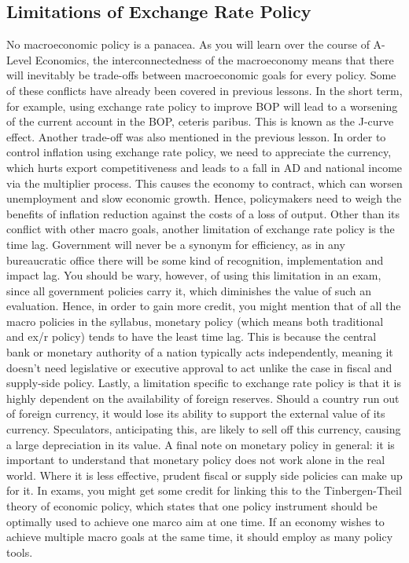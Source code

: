 \documentclass[DIV=classic,11pt,numbers=noenddot,listof=totoc,bibliography=totoc,parskip]{scrartcl}
\begin{document}
\subsection{Limitations of Exchange Rate Policy}
No macroeconomic policy is a panacea. As you will learn over the course of A-Level Economics, the interconnectedness of the macroeconomy means that there will inevitably be trade-offs between macroeconomic goals for every policy. Some of these conflicts have already been covered in previous lessons. In the short term, for example, using exchange rate policy to improve BOP will lead to a worsening of the current account in the BOP, ceteris paribus. This is known as the J-curve effect. Another trade-off was also mentioned in the previous lesson. In order to control inflation using exchange rate policy, we need to appreciate the currency, which hurts export competitiveness and leads to a fall in AD and national income via the multiplier process. This causes the economy to contract, which can worsen unemployment and slow economic growth. Hence, policymakers need to weigh the benefits of inflation reduction against the costs of a loss of output. Other than its conflict with other macro goals, another limitation of exchange rate policy is the time lag. Government will never be a synonym for efficiency, as in any bureaucratic office there will be some kind of recognition, implementation and impact lag. You should be wary, however, of using this limitation in an exam, since all government policies carry it, which diminishes the value of such an evaluation. Hence, in order to gain more credit, you might mention that of all the macro policies in the syllabus, monetary policy (which means both traditional and ex/r policy) tends to have the least time lag. This is because the central bank or monetary authority of a nation typically acts independently, meaning it doesn’t need legislative or executive approval to act unlike the case in fiscal and supply-side policy. Lastly, a limitation specific to exchange rate policy is that it is highly dependent on the availability of foreign reserves. Should a country run out of foreign currency, it would lose its ability to support the external value of its currency. Speculators, anticipating this, are likely to sell off this currency, causing a large depreciation in its value. A final note on monetary policy in general: it is important to understand that monetary policy does not work alone in the real world. Where it is less effective, prudent fiscal or supply side policies can make up for it. In exams, you might get some credit for linking this to the Tinbergen-Theil theory of economic policy, which states that one policy instrument should be optimally used to achieve one marco aim at one time. If an economy wishes to achieve multiple macro goals at the same time, it should employ as many policy tools. 
\end{document}
